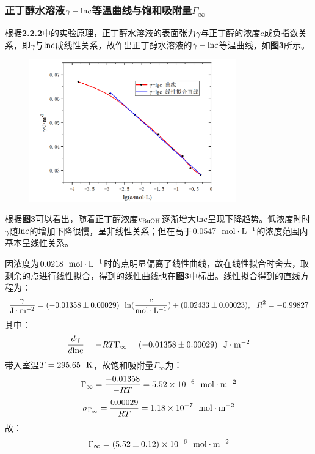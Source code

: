 \documentclass[12pt]{article}
\begin{document}
			\subsubsection{正丁醇水溶液$\gamma-{\rm ln}c$等温曲线与饱和吸附量$\Gamma_{\infty}$}
			根据\textbf{2.2.2}中的实验原理，正丁醇水溶液的表面张力$\gamma$与正丁醇的浓度$c$成负指数关系，即$\gamma$与${\rm ln}c$成线性关系，故作出正丁醇水溶液的$\gamma-{\rm ln}c$等温曲线，如\textbf{图3}所示。
			\begin{figure}[h]
				\centering
				\includegraphics[width=0.8\textwidth]{3.png}
			\end{figure}
			\par
			根据\textbf{图3}可以看出，随着正丁醇浓度$c_{\rm BuOH}$逐渐增大${\rm ln}c$呈现下降趋势。低浓度时时$\gamma$随${\rm ln}c$的增加下降很慢，呈非线性关系；但在高于$0.0547\ \ {\rm mol\cdot L^{-1}}$的浓度范围内基本呈线性关系。\par 
			因浓度为$0.0218\ \ {\rm mol\cdot L^{-1}}$时的点明显偏离了线性曲线，故在线性拟合时舍去，取剩余的点进行线性拟合，得到的线性曲线也在\textbf{图3}中标出。线性拟合得到的直线方程为：
			$$
			\frac{\gamma}{{\rm J\cdot m^{-2}}}=(-0.01358 \pm 0.00029)\ \ {\rm ln}(\frac{c}{{\rm mol\cdot L^{-1}}})+(0.02433\pm 0.00023),\ \ R^{2}=-0.99827
			$$
			其中：
			$$
			\frac{d\gamma}{d{\rm lnc}} =  -RT\Gamma_{\infty} =(-0.01358 \pm 0.00029)\ \ {\rm J\cdot m^{-2}} 
			$$
			带入室温$T=295.65\ \ {\rm K}$，故饱和吸附量$\Gamma_{\infty}$为：
			$$
			\Gamma_{\infty}=\frac{-0.01358}{-RT} =5.52\times 10^{-6}\ \ {\rm mol\cdot m^{-2}}
			$$
			$$
			\sigma_{\Gamma_{\infty}}=\frac{0.00029}{RT}=1.18\times 10^{-7}\ \ {\rm mol\cdot m^{-2}}
			$$
			故：
			$$
			\Gamma_{\infty}=(5.52\pm 0.12)\times 10^{-6}\ \ {\rm mol\cdot m^{-2}}
			$$
\end{document}
